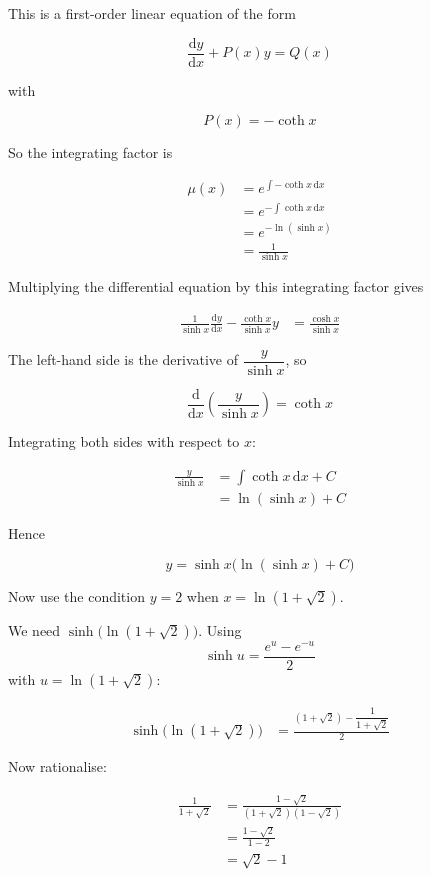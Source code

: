 \documentclass[leqno]{article}
\begin{document}
\begin{enumerate}[
  label=\textbf{\arabic*.},
  leftmargin=*,
  topsep=0pt,
  partopsep=0pt,
  parsep=0pt
]
\begin{tcolorbox}[colback=white, colframe=scarlet, title={\textbf{Solution}}, breakable, grow to left by=6mm, grow to right by=10mm]
This is a first-order linear equation of the form

\[
\frac{\mathrm{d}y}{\mathrm{d}x} + P(x)y = Q(x)
\]

with

\[
P(x) = -\coth x
\]

So the integrating factor is

\begin{align*}
\mu(x) &= e^{\int -\coth x\,\mathrm{d}x} \\
&= e^{-\int \coth x\,\mathrm{d}x} \\
&= e^{-\ln(\sinh x)} \\
&= \frac{1}{\sinh x}
\end{align*}

Multiplying the differential equation by this integrating factor gives

\begin{align*}
\frac{1}{\sinh x}\frac{\mathrm{d}y}{\mathrm{d}x} - \frac{\coth x}{\sinh x}y &= \frac{\cosh x}{\sinh x}
\end{align*}

The left-hand side is the derivative of $\dfrac{y}{\sinh x}$, so

\[
\frac{\mathrm{d}}{\mathrm{d}x}\left(\frac{y}{\sinh x}\right)=\coth x
\]

Integrating both sides with respect to $x$:

\begin{align*}
\frac{y}{\sinh x} &= \int \coth x\,\mathrm{d}x + C \\
&= \ln(\sinh x) + C
\end{align*}

Hence

\[
y=\sinh x\bigl(\ln(\sinh x)+C\bigr)
\]

Now use the condition $y=2$ when $x=\ln(1+\sqrt{2})$.

We need $\sinh\bigl(\ln(1+\sqrt{2})\bigr)$. Using
\[
\sinh u=\frac{e^u-e^{-u}}{2}
\]
with $u=\ln(1+\sqrt{2})$:

\begin{align*}
\sinh\bigl(\ln(1+\sqrt{2})\bigr)
&= \frac{(1+\sqrt{2})-\dfrac{1}{1+\sqrt{2}}}{2}
\end{align*}

Now rationalise:

\begin{align*}
\frac{1}{1+\sqrt{2}}
&= \frac{1-\sqrt{2}}{(1+\sqrt{2})(1-\sqrt{2})} \\
&= \frac{1-\sqrt{2}}{1-2} \\
&= \sqrt{2}-1
\end{align*}


\end{tcolorbox}
\end{enumerate}
\end{document}
